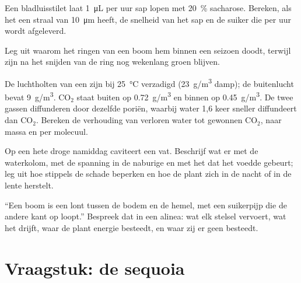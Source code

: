 \begin{exercise}[$\star\star$]\label{exo:b1:plant-transport:8}
Een bladluisstilet laat \qty{1}{\micro L} per uur sap lopen met
\qty{20}{\%} sacharose. Bereken, als het  een straal van
\qty{10}{\micro m} heeft, de snelheid van het sap en de suiker die per uur
wordt afgeleverd.
\end{exercise}

\begin{exercise}[$\star\star$]\label{exo:b1:plant-transport:9}
Leg uit waarom het ringen van een boom hem binnen een seizoen doodt, terwijl
zijn  na het snijden van de ring nog wekenlang groen blijven.
\end{exercise}

\begin{exercise}[$\star\star\star$]\label{exo:b1:plant-transport:10}
De luchtholten van een  zijn bij \qty{25}{\celsius} verzadigd
(\qty{23}{g/m^3} damp); de buitenlucht bevat \qty{9}{g/m^3}.
$\mathrm{CO_2}$ staat buiten op \qty{0.72}{g/m^3} en binnen op
\qty{0.45}{g/m^3}. De twee gassen diffunderen door dezelfde poriën, waarbij
water 1,6 keer sneller diffundeert dan $\mathrm{CO_2}$. Bereken de
verhouding van verloren water tot gewonnen $\mathrm{CO_2}$, naar massa en
per molecuul.
\end{exercise}

\begin{exercise}[$\star\star\star$]\label{exo:b1:plant-transport:11}
Op een hete droge namiddag caviteert een vat. Beschrijf wat er met de
waterkolom, met de spanning in de naburige  en met het  dat het
voedde gebeurt; leg uit hoe stippels de schade beperken en hoe de plant zich
in de nacht of in de lente herstelt.
\end{exercise}

\begin{exercise}[$\star\star\star$]\label{exo:b1:plant-transport:12}
``Een boom is een lont tussen de bodem en de hemel, met een suikerpijp die
de andere kant op loopt.'' Bespreek dat in een alinea: wat elk stelsel
vervoert, wat het drijft, waar de plant energie besteedt, en waar zij er
geen besteedt.
\end{exercise}

\section{Vraagstuk: de sequoia}

